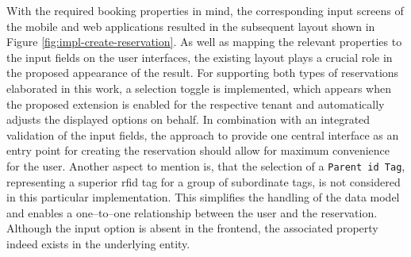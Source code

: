 \newpage

\noindent With the required booking properties in mind, the corresponding input screens of the mobile and web applications resulted in the subsequent layout shown in Figure \ref{fig:impl-create-reservation}. 
As well as mapping the relevant properties to the input fields on the user interfaces, the existing layout plays a crucial role in the proposed appearance of the result.
For supporting both types of reservations elaborated in this work, a selection toggle is implemented, which appears when the proposed extension is enabled for the respective tenant and automatically adjusts the displayed options on behalf.
In combination with an integrated validation of the input fields, the approach to provide one central interface as an entry point for creating the reservation should allow for maximum convenience for the user.
Another aspect to mention is, that the selection of a \texttt{Parent \acrshort{id} Tag}, representing a superior \acrshort{rfid} tag for a group of subordinate tags, is not considered in this particular implementation. 
This simplifies the handling of the data model and enables a one--to--one relationship between the user and the reservation.
Although the input option is absent in the frontend, the associated property indeed exists in the underlying entity.

